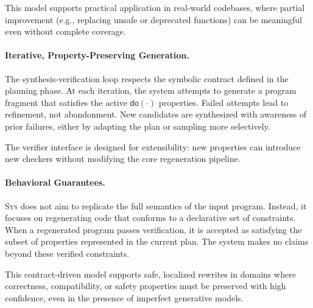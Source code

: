 \documentclass[sigplan]{acmart}
\newcommand{\sys}{{\scshape Sys}\xspace}
\begin{document}
This model supports practical application in real-world codebases, where partial improvement (e.g., replacing unsafe or deprecated functions) can be meaningful even without complete coverage.

\paragraph{Iterative, Property-Preserving Generation.}
The synthesis-verification loop respects the symbolic contract defined in the planning phase. At each iteration, the system attempts to generate a program fragment that satisfies the active $\mathsf{do}(\cdot)$ properties. Failed attempts lead to refinement, not abandonment. New candidates are synthesized with awareness of prior failures, either by adapting the plan or sampling more selectively.

The verifier interface is designed for extensibility: new properties can introduce new checkers without modifying the core regeneration pipeline.

\paragraph{Behavioral Guarantees.}
\sys does not aim to replicate the full semantics of the input program. Instead, it focuses on regenerating code that conforms to a declarative set of constraints. When a regenerated program passes verification, it is accepted as satisfying the subset of properties represented in the current plan. The system makes no claims beyond these verified constraints.

This contract-driven model supports safe, localized rewrites in domains where correctness, compatibility, or safety properties must be preserved with high confidence, even in the presence of imperfect generative models.


\end{document}
